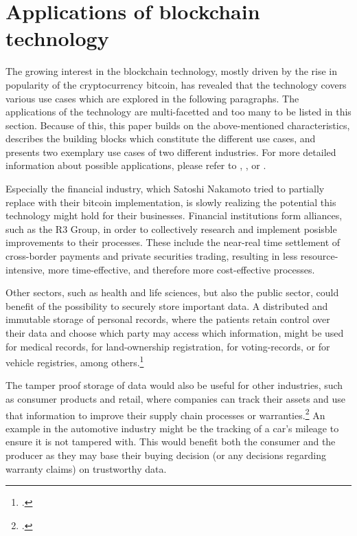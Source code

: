 
\section{Applications of blockchain technology} \label{sec:SmartContracts}
The growing interest in the blockchain technology, mostly driven by the rise in popularity of the cryptocurrency bitcoin, has revealed that the technology covers various use cases which are explored in the following paragraphs. The applications of the technology are multi-facetted and too many to be listed in this section. Because of this, this paper builds on the above-mentioned characteristics, describes the building blocks which constitute the different use cases, and presents two exemplary use cases of two different industries. For more detailed information about possible applications, please refer to \cite{AntonopolousAndreasM..2017}, \cite{SchatskybitcoinBlockchaincoming2015}, or \cite{Schutte.2017}.



Especially the financial industry, which Satoshi Nakamoto tried to partially replace with their bitcoin implementation, is slowly realizing the potential this technology might hold for their businesses. Financial institutions form alliances, such as the R3 Group, in order to collectively research and implement posisble improvements to their processes. These include the near-real time settlement of cross-border payments and private securities trading, resulting in less resource-intensive, more time-effective, and therefore more cost-effective processes.

Other sectors, such as health and life sciences, but also the public sector, could benefit of the possibility to securely store important data. A distributed and immutable storage of personal records, where the patients retain control over their data and choose which party may access which information, might be used for medical records, for land-ownership registration, for voting-records, or for vehicle registries, among others.\footcites[Cf.][]{SchatskybitcoinBlockchaincoming2015}[cf.][chapter 12]{AntonopolousAndreasM..2017}[cf.][p.167]{XXXX} 

The tamper proof storage of data would also be useful for other industries, such as consumer products and retail, where companies can track their assets and use that information to improve their supply chain processes or warranties.\footcite[Cf.][p.31]{GOV.2016} An example in the automotive industry might be the tracking of a car's mileage to ensure it is not tampered with. This would benefit both the consumer and the producer as they may base their buying decision (or any decisions regarding warranty claims) on trustworthy data.



